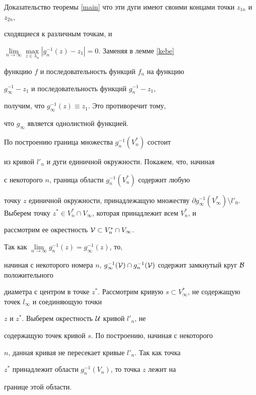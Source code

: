 \begin{pf*}{Доказательство теоремы \ref{main}}
что эти дуги имеют своими концами точки $z_{1n}$ и $z_{2n}$,


сходящиеся к различным точкам, и


$\lim\limits_{n\to\infty}\max\limits_{z\in


\lambda_n}|g_n^{-1}(z)-z_1|=0$. Заменяя в лемме \ref{kebe}


функцию $f$ и последовательность функций $f_n$ на функцию


$g^{-1}_\infty-z_1$ и последовательность функций $g^{-1}_n-z_1$,


получим, что $g^{-1}_\infty(z)\equiv z_1$. Это противоречит тому,


что $g_\infty$ является однолистной функцией.





По построению граница множества $g_n^{-1}(V_n^*)$ состоит


из кривой $l'_n$ и дуги единичной окружности. Покажем, что, начиная


с некоторого $n$, граница области $g_n^{-1}(V_n^*)$ содержит любую


точку $z$ единичной окружности, принадлежащую множеству $\partial


g^{-1}_\infty(V^*_\infty)\setminus l'_0$. Выберем точку $z^*\in


V^*_n\cap V_\infty$, которая принадлежит всем $V^*_n$, и


рассмотрим ее окрестность ${\cal V}\subset V^*_n\cap V_\infty$.


Так как $\lim\limits_{n\to\infty}g^{-1}_n(z)=g^{-1}_\infty(z)$, то,


начиная с некоторого номера $n$, $g^{-1}_\infty({\cal V})\cap


g^{-1}_n(\cal V)$ содержит замкнутый круг $\cal B$ положительного


диаметра с центром в точке $z^*$. Рассмотрим кривую $s\subset


V_\infty^*$, не содержащую точек $l_\infty$ и соединяющую точки


$z$ и $z^*$. Выберем окрестность $\cal U$ кривой $l'_n$, не


содержащую точек кривой $s$. По построению, начиная с некоторого


$n$, данная кривая не пересекает кривые $l'_n$. Так как точка


$z^*$ принадлежит области $g^{-1}_n(V_n)$, то точка $z$ лежит на


границе этой области.






\end{pf*}
